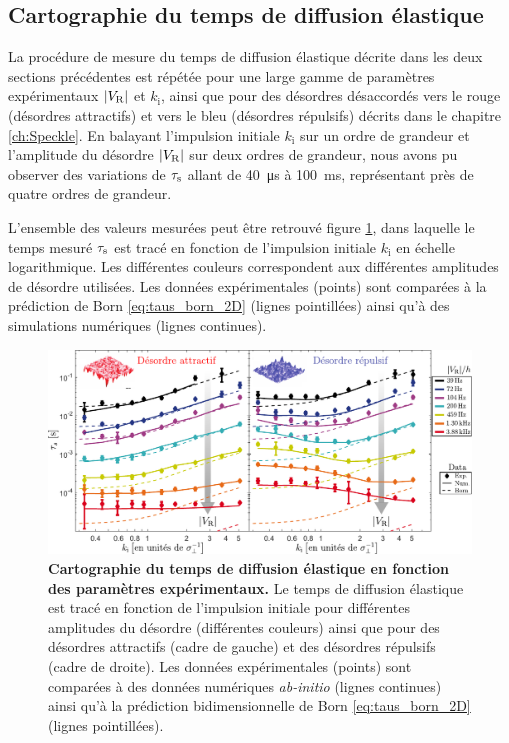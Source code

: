 \subsection{Cartographie du temps de diffusion élastique}

La procédure de mesure du temps de diffusion élastique décrite dans les deux sections précédentes est répétée pour une large gamme de paramètres expérimentaux $|V_{\mathrm{R}}|$ et $k_{\mathrm{i}}$, ainsi que pour des désordres désaccordés vers le rouge (désordres attractifs) et vers le bleu (désordres répulsifs) décrits dans le chapitre \ref{ch:Speckle}. En balayant l'impulsion initiale $k_{\mathrm{i}}$ sur un ordre de grandeur et l'amplitude du désordre $|V_{\mathrm{R}}|$ sur deux ordres de grandeur, nous avons pu observer des variations de $\tau_{\mathrm{s}}$ allant de \SI{40}{\micro\second} à \SI{100}{\milli\second}, représentant près de quatre ordres de grandeur. 

L'ensemble des valeurs mesurées peut être retrouvé figure \ref{fig:donnees_taus_prl}, dans laquelle le temps mesuré $\tau_{\mathrm{s}}$ est tracé en fonction de l'impulsion initiale $k_{\mathrm{i}}$ en échelle logarithmique. Les différentes couleurs correspondent aux différentes amplitudes de désordre utilisées. Les données expérimentales (points) sont comparées à la prédiction de Born \ref{eq:taus_born_2D} (lignes pointillées) ainsi qu'à des simulations numériques (lignes continues). 

\begin{figure}
\centering
\includegraphics[width=\textwidth]{Fig/TauS_PRL/donnees_taus_prl.pdf}
\caption{\textbf{Cartographie du temps de diffusion élastique en fonction des paramètres expérimentaux.} Le temps de diffusion élastique est tracé en fonction de l'impulsion initiale pour différentes amplitudes du désordre (différentes couleurs) ainsi que pour des désordres attractifs (cadre de gauche) et des désordres répulsifs (cadre de droite). Les données expérimentales (points) sont comparées à des données numériques \textit{ab-initio} (lignes continues) ainsi qu'à la prédiction bidimensionnelle de Born \ref{eq:taus_born_2D} (lignes pointillées).}
\label{fig:donnees_taus_prl}
\end{figure}

